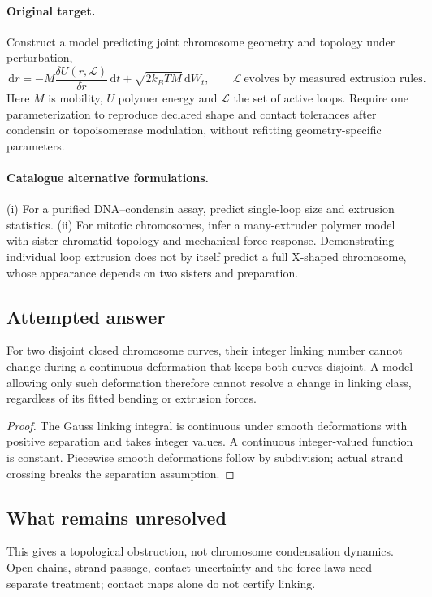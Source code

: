 \documentclass[11pt]{article}
\begin{document}
\paragraph{Original target.}
Construct a model predicting joint chromosome geometry and topology under perturbation,
\[\,\mathrm{d} r=-M\frac{\delta U(r,\mathcal L)}{\delta r}\,\mathrm{d} t+\sqrt{2k_BT M}\,\mathrm{d} W_t,\qquad \mathcal L\ \text{evolves by measured extrusion rules}.\]
Here $M$ is mobility, $U$ polymer energy and $\mathcal L$ the set of active loops. Require one parameterization to reproduce declared shape and contact tolerances after condensin or topoisomerase modulation, without refitting geometry-specific parameters.
\paragraph{Catalogue alternative formulations.}
(i) For a purified DNA--condensin assay, predict single-loop size and extrusion statistics. (ii) For mitotic chromosomes, infer a many-extruder polymer model with sister-chromatid topology and mechanical force response. Demonstrating individual loop extrusion does not by itself predict a full X-shaped chromosome, whose appearance depends on two sisters and preparation.
\subsection{Attempted answer}
\begin{proposition}
For two disjoint closed chromosome curves, their integer linking number cannot change during a continuous deformation that keeps both curves disjoint. A model allowing only such deformation therefore cannot resolve a change in linking class, regardless of its fitted bending or extrusion forces.
\end{proposition}
\begin{proof}
The Gauss linking integral is continuous under smooth deformations with positive separation and takes integer values. A continuous integer-valued function is constant. Piecewise smooth deformations follow by subdivision; actual strand crossing breaks the separation assumption.
\end{proof}
\subsection{What remains unresolved}
This gives a topological obstruction, not chromosome condensation dynamics. Open chains, strand passage, contact uncertainty and the force laws need separate treatment; contact maps alone do not certify linking.
\end{document}
